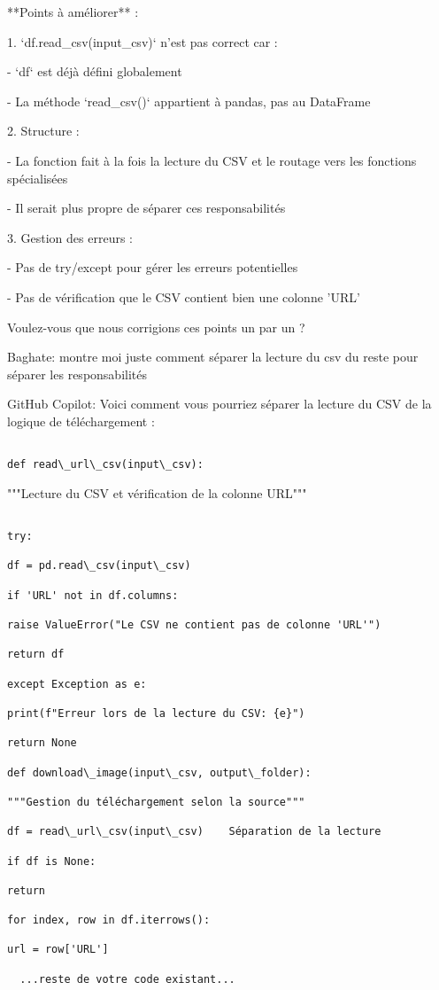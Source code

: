 **Points à améliorer** :

1. `df.read\_csv(input\_csv)` n'est pas correct car :

- `df` est déjà défini globalement

- La méthode `read\_csv()` appartient à pandas, pas au DataFrame

2. Structure :

- La fonction fait à la fois la lecture du CSV et le routage vers les fonctions spécialisées

- Il serait plus propre de séparer ces responsabilités

3. Gestion des erreurs :

- Pas de try/except pour gérer les erreurs potentielles

- Pas de vérification que le CSV contient bien une colonne 'URL'

Voulez-vous que nous corrigions ces points un par un ?

Baghate: montre moi juste comment séparer la lecture du csv du reste pour séparer les responsabilités

GitHub Copilot: Voici comment vous pourriez séparer la lecture du CSV de la logique de téléchargement :

\begin{verbatim}

def read\_url\_csv(input\_csv):

\end{verbatim}

"""Lecture du CSV et vérification de la colonne URL"""

\begin{verbatim}

try:

df = pd.read\_csv(input\_csv)

if 'URL' not in df.columns:

raise ValueError("Le CSV ne contient pas de colonne 'URL'")

return df

except Exception as e:

print(f"Erreur lors de la lecture du CSV: {e}")

return None

def download\_image(input\_csv, output\_folder):

"""Gestion du téléchargement selon la source"""

df = read\_url\_csv(input\_csv)    Séparation de la lecture

if df is None:

return

for index, row in df.iterrows():

url = row['URL']

  ...reste de votre code existant...

\end{verbatim}

